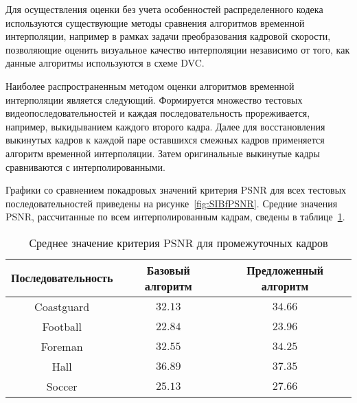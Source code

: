 Для осуществления оценки без учета особенностей распределенного кодека используются существующие методы сравнения алгоритмов временной интерполяции, например в рамках задачи преобразования кадровой скорости, позволяющие оценить визуальное качество интерполяции независимо от того, как данные алгоритмы используются в схеме DVC.

Наиболее распространенным методом оценки алгоритмов временной интерполяции является следующий. Формируется множество тестовых видеопоследовательностей и каждая последовательность прореживается, например, выкидыванием каждого второго кадра. Далее для восстановления выкинутых кадров к каждой паре оставшихся смежных кадров применяется алгоритм временной интерполяции. Затем оригинальные выкинутые кадры сравниваются с интерполированными.

Графики со сравнением покадровых значений критерия PSNR для всех тестовых последовательностей приведены на рисунке~\ref{fig:SIBfPSNR}. Средние значения PSNR, рассчитанные по всем интерполированным кадрам, сведены в таблице~\ref{tab:SIMeanPSNR}.

\begin{table}[H]
    \begin{center}
        \caption{Среднее значение критерия PSNR для промежуточных кадров}
        \label{tab:SIMeanPSNR}
        \begin{tabular}{|c|c|c|}
            \hline
            \textbf{Последовательность} & \textbf{Базовый алгоритм} & \textbf{Предложенный алгоритм} \\
            \hline
            Coastguard 	& $32.13$ 	& $34.66$ \\
            \hline
            Football	& $22.84$	& $23.96$ \\
            \hline
            Foreman 	& $32.55$	& $34.25$ \\
            \hline
            Hall 		& $36.89$ 	& $37.35$ \\
            \hline
            Soccer 		& $25.13$ 	& $27.66$ \\
            \hline
        \end{tabular}
    \end{center}
\end{table}

